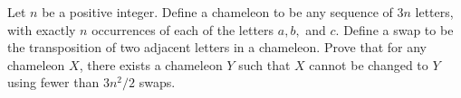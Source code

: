 Let 
$n$
 be a positive integer. Define a chameleon to be any sequence of 
$3n$
 letters, with exactly 
$n$
 occurrences of each of the letters 
$a, b,$
 and 
$c$.
 Define a swap to be the transposition of two adjacent letters in a chameleon. Prove that for any chameleon 
$X$, there exists a chameleon 
$Y$
 such that 
$X$
 cannot be changed to 
$Y$
 using fewer than 
$3n^2/2$
 swaps.
